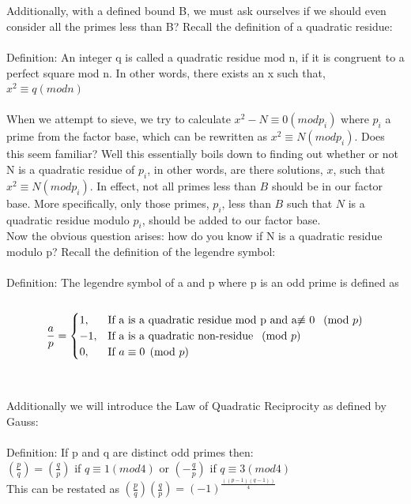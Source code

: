 \documentclass[12pt]{article} %
\begin{document}
	\\\\
	Additionally, with a defined bound B, we must ask ourselves if we should even consider all the primes less than B? Recall the definition of a quadratic residue:
	\\\\
	Definition: An integer q is called a quadratic residue mod n, if it is congruent to a perfect square mod n. In other words, there exists an x such that, $x^{2} \equiv q(mod  n)$ 
	\\\\
	When we attempt to sieve, we try to calculate $x^{2}-N\equiv 0(mod p_i)$ where $p_i$ a prime from the factor base, which can be rewritten as $x^{2} \equiv N(mod p_i)$. Does this seem familiar? Well this essentially boils down to finding out whether or not N is a quadratic residue of $p_i$, in other words, are there solutions, $x$, such that $x^{2}\equiv N(mod p_i)$. In effect, not all primes less than $B$ should be in our factor base. More specifically, only those primes, $p_i$, less than $B$ such that $N$ is a quadratic residue modulo $p_i$, should be added to our factor base. 
	\\\indent Now the obvious question arises: how do you know if N is a quadratic residue modulo p? Recall the definition of the legendre symbol:
	\\\\
	Definition: The legendre symbol of a and p where p is an odd prime is defined as 
	\\\\
	$$
	\frac{a}{p} = \begin{cases}
	1, & \textmd{If a is a quadratic residue mod p and a$\not\equiv$ 0 $\pmod{p}$}\\
	-1, & \textmd{If a is a quadratic non-residue $\pmod{p}$}\\
	0, & \textmd{If $a\equiv 0 \pmod{p}$}\\
	\end{cases}
	$$
	\\\\Additionally we will introduce the Law of Quadratic Reciprocity as defined by Gauss:
	\\\\Definition: If p and q are distinct odd primes then:
	\\$\left(\frac{p}{q}\right) = \left(\frac{q}{p}\right)$ if $q\equiv 1(mod 4)$ or $\left(-\frac{q}{p}\right)$ if $q\equiv 3(mod 4)$
	\\This can be restated as $\left(\frac{p}{q}\right)\left(\frac{q}{p}\right) = \left(-1\right)^{\frac{\left((p-1)(q-1)\right)}{4}}$
\end{document}
